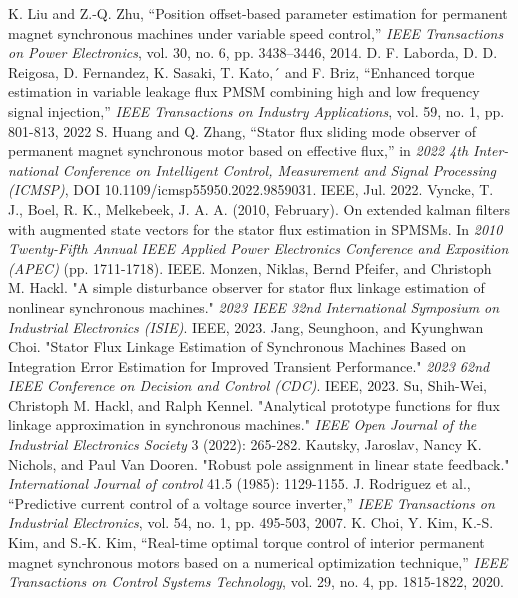 \documentclass[conference]{IEEEtran}
\begin{document}
\begin{thebibliography}{00}
 K. Liu and Z.-Q. Zhu, “Position offset-based parameter estimation for permanent magnet synchronous machines under variable speed control,” {\it{IEEE Transactions on Power Electronics}}, vol. 30, no. 6, pp. 3438–3446, 2014. 
D. F. Laborda, D. D. Reigosa, D. Fernandez, K. Sasaki, T. Kato,´ and F. Briz, “Enhanced torque estimation in variable leakage flux PMSM combining high and low frequency signal injection,” {\it{IEEE Transactions on Industry Applications}}, vol. 59, no. 1, pp. 801-813, 2022 
S. Huang and Q. Zhang, “Stator flux sliding mode observer of permanent magnet synchronous motor based on effective flux,” in {\it{2022 4th Inter-national Conference on Intelligent Control, Measurement and Signal Processing (ICMSP)}}, DOI 10.1109/icmsp55950.2022.9859031. IEEE, Jul. 2022.
Vyncke, T. J., Boel, R. K., Melkebeek, J. A. A. (2010, February). On extended kalman filters with augmented state vectors for the stator flux estimation in SPMSMs. In {\it{2010 Twenty-Fifth Annual IEEE Applied Power Electronics Conference and Exposition (APEC)}} (pp. 1711-1718). IEEE.
Monzen, Niklas, Bernd Pfeifer, and Christoph M. Hackl. "A simple disturbance observer for stator flux linkage estimation of nonlinear synchronous machines." {\it{2023 IEEE 32nd International Symposium on Industrial Electronics (ISIE)}}. IEEE, 2023.
 Jang, Seunghoon, and Kyunghwan Choi. "Stator Flux Linkage Estimation of Synchronous Machines Based on Integration Error Estimation for Improved Transient Performance." {\it{2023 62nd IEEE Conference on Decision and Control (CDC)}}. IEEE, 2023.
Su, Shih-Wei, Christoph M. Hackl, and Ralph Kennel. "Analytical prototype functions for flux linkage approximation in synchronous machines." {\it{IEEE Open Journal of the Industrial Electronics Society}} 3 (2022): 265-282.
Kautsky, Jaroslav, Nancy K. Nichols, and Paul Van Dooren. "Robust pole assignment in linear state feedback." {\it{International Journal of control}} 41.5 (1985): 1129-1155.
J. Rodriguez et al., “Predictive current control of a voltage source inverter,” {\it{IEEE Transactions on Industrial Electronics}}, vol. 54, no. 1, pp. 495-503, 2007. 
K. Choi, Y. Kim, K.-S. Kim, and S.-K. Kim, “Real-time optimal torque control of interior permanent magnet synchronous motors based on a numerical optimization technique,” {\it{IEEE Transactions on Control Systems Technology}}, vol. 29, no. 4, pp. 1815-1822, 2020.
\end{thebibliography}
\end{document}
